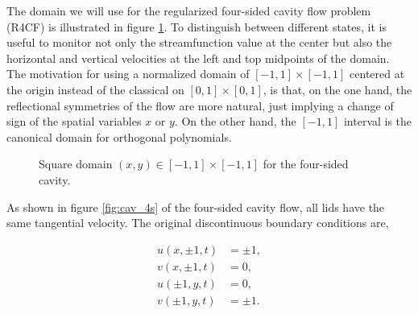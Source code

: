 The domain we will use for the regularized four-sided cavity flow problem
(R4CF) is illustrated in figure \ref{fig:cav_domain}. To distinguish between
different states, it is useful to monitor not only the streamfunction value at
the center but also the horizontal and vertical velocities at the left and top
midpoints of the domain. The motivation for using a normalized domain of
$[-1,1]\times[-1,1]$ centered at the origin instead of the classical on
$[0,1]\times[0,1]$, is that, on the one hand, the reflectional symmetries of
the flow are more natural, just implying a change of sign of the spatial
variables $x$ or $y$. On the other hand, the $[-1,1]$ interval is the canonical
domain for orthogonal polynomials. 

\begin{figure}[ht]
\centering
{}
\caption{Square domain $(x,y) \in [-1,1]\times[-1,1]$ for the four-sided cavity.}
\label{fig:cav_domain}
\end{figure}

As shown in figure \ref{fig:cav_4s} of the four-sided cavity flow, all lids
have the same tangential velocity. The original discontinuous boundary
conditions are,

\begin{align}
u(x,\pm 1,t) &= \pm 1,\label{non_reg_u_bca} \\
v(x,\pm 1,t) &= 0, \\
u(\pm 1,y,t) &= 0, \\
v(\pm 1,y,t) &= \pm 1.\label{non_reg_u_bcb}
\end{align}

